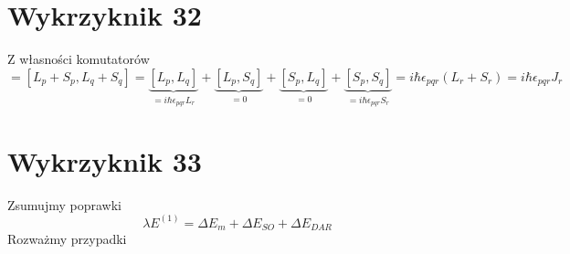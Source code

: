 \documentclass[a4paper,12pt]{article}
\begin{document}
\section{Wykrzyknik 32}

Z własności komutatorów
\begin{equation*}
  [J_p, J_q] = [L_p +S_p, L_q + S_q] = \underbrace{[L_p,
  L_q]}_{=i\hbar\epsilon_{pqr} L_r} + \underbrace{[L_p, S_q]}_{=0}
  + \underbrace{[S_p, L_q]}_{=0} + \underbrace{[S_p,
  S_q]}_{=i\hbar\epsilon_{pqr} S_r} = i\hbar \epsilon_{pqr} (L_r +
  S_r) = i\hbar \epsilon_{pqr} J_r
\end{equation*}

\section{Wykrzyknik 33}
	 Zsumujmy poprawki
	 $$
	 \lambda E^{(1)} = \Delta E_m + \Delta E_{SO} + \Delta E_{DAR}
	 $$
	 Rozważmy przypadki
\end{document}
